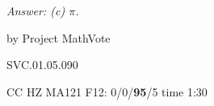
{\it Answer: (c) $\pi$.}

\medskip
by Project MathVote

SVC.01.05.090

CC HZ MA121 F12: 0/0/{\bf95}/5 time 1:30  \\

